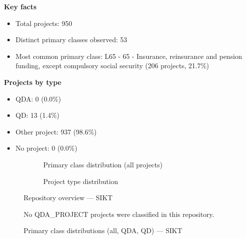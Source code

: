 \textbf{Key facts}

\begin{itemize}
    \item Total projects: 950
    \item Distinct primary classes observed: 53
    \item Most common primary class: L65 - 65 - Insurance, reinsurance and pension funding, except compulsory social security (206 projects, 21.7\%)
\end{itemize}

\textbf{Projects by type}

\begin{itemize}
    \item QDA: 0 (0.0\%)
    \item QD: 13 (1.4\%)
    \item Other project: 937 (98.6\%)
    \item No project: 0 (0.0\%)
\end{itemize}

\begin{figure}[H]
    \centering
    \begin{subfigure}[t]{0.49\textwidth}
        \centering
        
        \caption{Primary class distribution (all projects)}
    \end{subfigure}
    \hfill
    \begin{subfigure}[t]{0.49\textwidth}
        \centering
        
        \caption{Project type distribution}
    \end{subfigure}
    \caption{Repository overview --- SIKT}
\end{figure}

\clearpage

\begin{figure}[H]
    \centering
    
    \par\vspace{0.8em}
    No QDA\_PROJECT projects were classified in this repository.
    \par\vspace{0.8em}
    
    \caption{Primary class distributions (all, QDA, QD) --- SIKT}
\end{figure}

